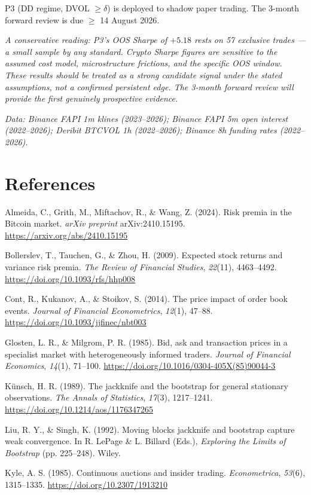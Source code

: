 \documentclass[12pt, a4paper]{article}
\theoremstyle{plain}
\theoremstyle{definition}
\begin{document}
P3 (DD regime, DVOL $\geq \delta$) is deployed to shadow paper trading.
The 3-month forward review is due $\geq$ 14 August 2026.

\vspace{0.5em}
\noindent\textit{A conservative reading: P3's OOS Sharpe of $+5.18$ rests on
57 exclusive trades --- a small sample by any standard.  Crypto Sharpe
figures are sensitive to the assumed cost model, microstructure frictions,
and the specific OOS window.  These results should be treated as a strong
candidate signal under the stated assumptions, not a confirmed persistent
edge.  The 3-month forward review will provide the first genuinely
prospective evidence.}

\vspace{1em}
\noindent\textit{Data: Binance FAPI 1m klines (2023--2026); Binance FAPI
5m open interest (2022--2026); Deribit BTCVOL 1h (2022--2026);
Binance 8h funding rates (2022--2026).}

\section*{References}
\begingroup
\setlength{\parindent}{-2em}
\setlength{\leftskip}{2em}
\setlength{\parskip}{6pt}
\small

Almeida, C., Grith, M., Miftachov, R., \& Wang, Z. (2024). Risk premia in the Bitcoin market. \textit{arXiv preprint} arXiv:2410.15195. \url{https://arxiv.org/abs/2410.15195}

Bollerslev, T., Tauchen, G., \& Zhou, H. (2009). Expected stock returns and variance risk premia. \textit{The Review of Financial Studies}, \textit{22}(11), 4463--4492. \url{https://doi.org/10.1093/rfs/hhp008}

Cont, R., Kukanov, A., \& Stoikov, S. (2014). The price impact of order book events. \textit{Journal of Financial Econometrics}, \textit{12}(1), 47--88. \url{https://doi.org/10.1093/jjfinec/nbt003}

Glosten, L. R., \& Milgrom, P. R. (1985). Bid, ask and transaction prices in a specialist market with heterogeneously informed traders. \textit{Journal of Financial Economics}, \textit{14}(1), 71--100. \url{https://doi.org/10.1016/0304-405X(85)90044-3}

Künsch, H. R. (1989). The jackknife and the bootstrap for general stationary observations. \textit{The Annals of Statistics}, \textit{17}(3), 1217--1241. \url{https://doi.org/10.1214/aos/1176347265}

Liu, R. Y., \& Singh, K. (1992). Moving blocks jackknife and bootstrap capture weak convergence. In R. LePage \& L. Billard (Eds.), \textit{Exploring the Limits of Bootstrap} (pp. 225--248). Wiley.

Kyle, A. S. (1985). Continuous auctions and insider trading. \textit{Econometrica}, \textit{53}(6), 1315--1335. \url{https://doi.org/10.2307/1913210}

\endgroup
\end{document}
